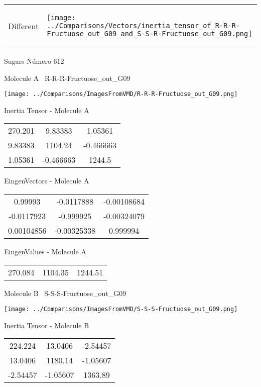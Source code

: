 \vtab[-5mm]
\begin{tabular}{*{2}{m{}}}
\begin{center}
\textcolor{NavyBlue}{\Large Different}
\end{center}
&
\begin{center}
\texttt{[image: ../Comparisons/Vectors/inertia\_tensor\_of\_R-R-R-Fructuose\_out\_G09\_and\_S-S-R-Fructuose\_out\_G09.png]}
\end{center}
\end{tabular}

 \newpage

\vtab[-3cm]
\begin{center}
{\large Sugars \tab Número 612}
\end{center}
\begin{multicols}{2}
\begin{center}

Molecule A \
R-R-R-Fructuose\_out\_G09

\texttt{[image: ../Comparisons/ImagesFromVMD/R-R-R-Fructuose\_out\_G09.png]}

Inertia Tensor - Molecule A \\
\begin{tabular}{|c c c|}
270.201	 & 	9.83383	 & 	1.05361	 \\
9.83383	 & 	1104.24	 & 	-0.466663	 \\
1.05361	 & 	-0.466663	 & 	1244.5
\end{tabular}

\vtab
 EingenVectors - Molecule A     \\
\begin{tabular}{|c c c|}
0.99993	 & 	-0.0117888	 & 	-0.00108684	 \\
-0.0117923	 & 	-0.999925	 & 	-0.00324079	 \\
0.00104856	 & 	-0.00325338	 & 	0.999994
\end{tabular}

\vtab
 EingenValues - Molecule A     \\
\begin{tabular}{|c c c|}
270.084	 & 	1104.35	 & 	1244.51	 \\
\end{tabular}
\columnbreak

Molecule B \
S-S-S-Fructuose\_out\_G09

\texttt{[image: ../Comparisons/ImagesFromVMD/S-S-S-Fructuose\_out\_G09.png]}

Inertia Tensor - Molecule B \\
\begin{tabular}{|c c c|}
224.224	 & 	13.0406	 & 	-2.54457	 \\
13.0406	 & 	1180.14	 & 	-1.05607	 \\
-2.54457	 & 	-1.05607	 & 	1363.89
\end{tabular}


\end{center}
\end{multicols}
